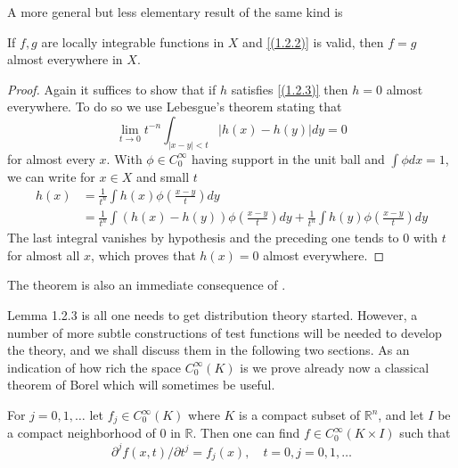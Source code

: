 A more general but less elementary result of the same kind is
\begin{theorem}
    If $f, g$ are locally integrable functions in $X$ and \eqref{(1.2.2)} is valid, then $f=g$ almost everywhere in $X$.
\end{theorem}
\begin{proof}
    Again it suffices to show that if $h$ satisfies \eqref{(1.2.3)} then $h=0$ almost everywhere. To do so we use Lebesgue's theorem stating that
\[
	\lim _{t \rightarrow 0} t^{-n} \int_{|x-y|<t}|h(x)-h(y)| d y=0
\]
for almost every $x$. With $\phi \in C_{0}^{\infty}$ having support in the unit ball and $\int \phi d x=1$, we can write for $x \in X$ and small $t$
\[
	\begin{aligned}
		h(x) & = \frac{1}{t^n}\int h(x) \phi\left(\frac{x-y}{t}\right) d y                                              \\
		     & =\frac{1}{t^n}\int(h(x)-h(y)) \phi\left(\frac{x-y}{t}\right) d y+ \frac{1}{t^n}\int h(y) \phi\left(\frac{x-y}{t}\right) d y
	\end{aligned}
\]
The last integral vanishes by hypothesis and the preceding one tends to 0 with $t$ for almost all $x$, which proves that $h(x)=0$ almost everywhere.
\end{proof}
\begin{remark}
    The theorem is also an immediate consequence of .
\end{remark}
Lemma 1.2.3 is all one needs to get distribution theory started. However, a number of more subtle constructions of test functions will be needed to develop the theory, and we shall discuss them in the following two sections. As an indication of how rich the space $C_{0}^{\infty}(K)$ is we prove already now a classical theorem of Borel which will sometimes be useful.
\begin{theorem}
    For $j=0,1, \ldots$ let $f_{j} \in C_{0}^{\infty}(K)$ where $K$ is a compact subset of $\mathbb{R}^{n}$, and let $I$ be a compact neighborhood of 0 in $\mathbb{R}$. Then one can find $f \in C_{0}^{\infty}(K \times I)$ such that
\[
	\partial^{j} f(x, t) / \partial t^{j}=f_{j}(x), \quad t=0, j=0,1, \ldots
\]
\end{theorem}

